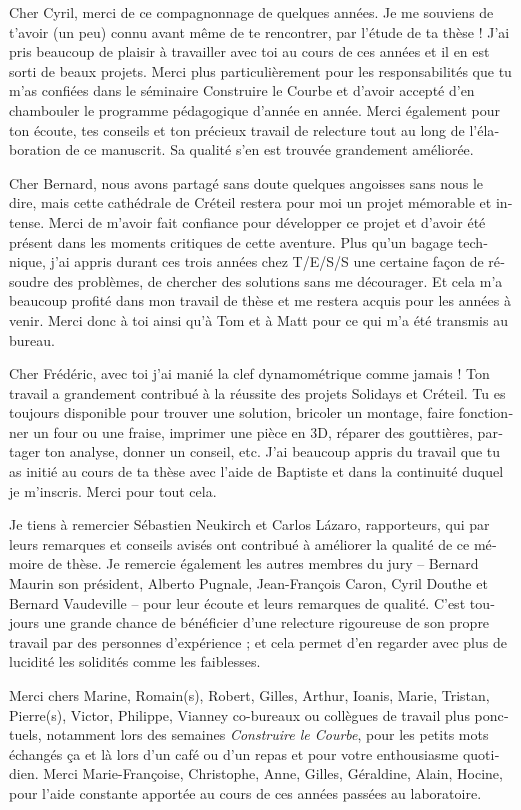 \begin{otherlanguage}{french}
Cher Cyril, merci de ce compagnonnage de quelques années. Je me souviens de t'avoir (un peu) connu avant même de te rencontrer, par l'étude de ta thèse ! J'ai pris beaucoup de plaisir à travailler avec toi au cours de ces années et il en est sorti de beaux projets. Merci plus particulièrement pour les responsabilités que tu m'as confiées dans le séminaire Construire le Courbe et d'avoir accepté d'en chambouler le programme pédagogique d'année en année. Merci également pour ton écoute, tes conseils et ton précieux travail de relecture tout au long de l'élaboration de ce manuscrit. Sa qualité s'en est trouvée grandement améliorée.

Cher Bernard, nous avons partagé sans doute quelques angoisses sans nous le dire, mais cette cathédrale de Créteil restera pour moi un projet mémorable et intense. Merci de m'avoir fait confiance pour développer ce projet et d'avoir été présent dans les moments critiques de cette aventure. Plus qu'un bagage technique, j'ai appris durant ces trois années chez T/E/S/S une certaine façon de résoudre des problèmes, de chercher des solutions sans me décourager. Et cela m'a beaucoup profité dans mon travail de thèse et me restera acquis pour les années à venir. Merci donc à toi ainsi qu'à Tom et à Matt pour ce qui m'a été transmis au bureau.

Cher Frédéric, avec toi j'ai manié la clef dynamométrique comme jamais ! Ton travail a grandement contribué à la réussite des projets Solidays et Créteil. Tu es toujours disponible pour trouver une solution, bricoler un montage, faire fonctionner un four ou une fraise, imprimer une pièce en 3D, réparer des gouttières, partager ton analyse, donner un conseil, etc. J'ai beaucoup appris du travail que tu as initié au cours de ta thèse avec l'aide de Baptiste et dans la continuité duquel je m'inscris. Merci pour tout cela.

Je tiens à remercier Sébastien Neukirch et Carlos Lázaro, rapporteurs, qui par leurs remarques et conseils avisés ont contribué à améliorer la qualité de ce mémoire de thèse. Je remercie également les autres membres du jury -- Bernard Maurin son président, Alberto Pugnale, Jean-François Caron, Cyril Douthe et Bernard Vaudeville -- pour leur écoute et leurs remarques de qualité. C'est toujours une grande chance de bénéficier d'une relecture rigoureuse de son propre travail par des personnes d'expérience ; et cela permet d'en regarder avec plus de lucidité les solidités comme les faiblesses.

Merci chers Marine, Romain(s), Robert, Gilles, Arthur, Ioanis, Marie, Tristan, Pierre(s), Victor, Philippe, Vianney \telp{} co-bureaux ou collègues de travail plus ponctuels, notamment lors des semaines \emph{Construire le Courbe}, pour les petits mots échangés ça et là lors d'un café ou d'un repas et pour votre enthousiasme quotidien. Merci Marie-Françoise, Christophe, Anne, Gilles, Géraldine, Alain, Hocine, pour l'aide constante apportée au cours de ces années passées au laboratoire.


\end{otherlanguage}
